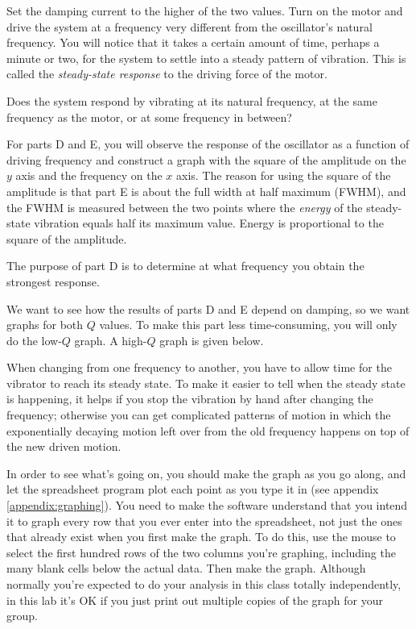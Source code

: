 Set the damping current to the higher of the two values.
Turn on the motor and drive the system at a frequency very
different from the oscillator's natural frequency. You will notice that
it takes a certain amount of time, perhaps a minute or two,
for the system to settle into a steady pattern of vibration.
This is called the \emph{steady-state response}
 to the driving force of the motor.

Does the system respond by vibrating at its natural
frequency, at the same frequency as the motor, or at some
frequency in between?


For parts D and E, you will observe the response of the oscillator
as a function of driving frequency and construct a graph 
with the square of the
amplitude on the $y$ axis and the frequency on the $x$ axis.
The reason for using the square of the amplitude is that part E
is about the full width at half maximum (FWHM), and the
FWHM is
measured between the two points where the \emph{energy} of
the steady-state vibration equals half its maximum value.
Energy is proportional to the square of the amplitude.

The purpose of part D is to determine at what frequency you
obtain the strongest response.

We want to see how the results of parts D and E depend on damping,
so we want graphs for both $Q$ values.
To make this part less time-consuming, you will only do the low-$Q$
graph. A high-$Q$ graph is given below.




When changing from one frequency to another, you have to allow time
for the vibrator to reach its steady state. To make it easier to
tell when the steady state is happening, it helps if you stop the vibration
by hand after changing the frequency; otherwise you can get complicated
patterns of motion in which the exponentially decaying motion left over
from the old frequency happens on top of the new driven motion.

In order to see what's going on, you should make the graph as
you go along, and let the spreadsheet program plot each point
as you type it in (see appendix \ref{appendix:graphing}).  You need to make the software
understand that you intend it to graph every row that you ever
enter into the spreadsheet, not just the ones that already exist when you first
make the graph. To do this, use the mouse to select the first hundred rows of the
two columns you're graphing, including the many blank cells below the actual data.
Then make the graph. Although normally you're expected to do your analysis in this
class totally independently, in this lab it's OK if you just print out multiple
copies of the graph for your group.

